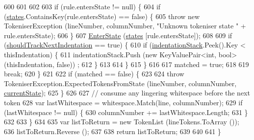\begin{DoxyCode}
600 
601 
602 
603                     \textcolor{keywordflow}{if} (rule.entersState != null) \{
604                         \textcolor{keywordflow}{if} (\hyperlink{a00047_a2c65c0ba90f973e459583badefef216a}{states}.ContainsKey(rule.entersState) == \textcolor{keyword}{false}) \{
605                             \textcolor{keywordflow}{throw} \textcolor{keyword}{new} TokeniserException (lineNumber, columnNumber, \textcolor{stringliteral}{"Unknown tokeniser
       state "} + rule.entersState);
606                         \}
607                         \hyperlink{a00047_ad3ef08f822b310d9864774b057b96995}{EnterState} (\hyperlink{a00047_a2c65c0ba90f973e459583badefef216a}{states} [rule.entersState]);
608 
609                         \textcolor{keywordflow}{if} (\hyperlink{a00047_ac670aac2245cbd4694dfbd5b69313218}{shouldTrackNextIndentation} == \textcolor{keyword}{true}) \{
610                             \textcolor{keywordflow}{if} (\hyperlink{a00047_a6631a1b1a9109258ab18927e7587ff9b}{indentationStack}.Peek().Key < thisIndentation) \{
611                                 indentationStack.Push (\textcolor{keyword}{new} KeyValuePair<int, bool>(thisIndentation, \textcolor{keyword}{false}))
      ;
612                             \}
613                                 
614                         \}
615                     \}
616 
617                     matched = \textcolor{keyword}{true};
618 
619                     \textcolor{keywordflow}{break};
620                 \}
621 
622                 \textcolor{keywordflow}{if} (matched == \textcolor{keyword}{false}) \{
623 
624                     \textcolor{keywordflow}{throw} TokeniserException.ExpectedTokensFromState (lineNumber, columnNumber, 
      \hyperlink{a00047_ac90b7dce8103425a148f9e8588f14137}{currentState});
625                 \}
626 
627                 \textcolor{comment}{// consume any lingering whitespace before the next token}
628                 var lastWhitespace = whitespace.Match(line, columnNumber);
629                 \textcolor{keywordflow}{if} (lastWhitespace != null) \{
630                     columnNumber += lastWhitespace.Length;
631                 \}
632 
633             \}
634 
635             var listToReturn = \textcolor{keyword}{new} TokenList (lineTokens.ToArray ());
636             listToReturn.Reverse ();
637 
638             \textcolor{keywordflow}{return} listToReturn;
639 
640 
641         \}
\end{DoxyCode}


